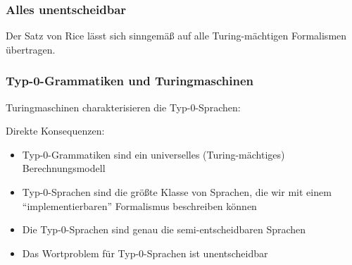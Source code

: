 \documentclass[onlymath]{beamer}
\begin{document}
\begin{frame}\frametitle{Alles unentscheidbar}


Der Satz von Rice lässt sich sinngemäß auf alle Turing-mächtigen Formalismen übertragen.

\end{frame}


\begin{frame}\frametitle{Typ-0-Grammatiken und Turingmaschinen}

Turingmaschinen charakterisieren die Typ-0-Sprachen:\medskip

\medskip\pause

\alert{Direkte Konsequenzen:}
\begin{itemize}
\item Typ-0-Grammatiken sind ein universelles (Turing-mächtiges) Berechnungsmodell
\item Typ-0-Sprachen sind die größte Klasse von Sprachen, die wir mit einem "`implementierbaren"' Formalismus beschreiben können
\item Die Typ-0-Sprachen sind genau die semi-entscheidbaren Sprachen
\item Das Wortproblem für Typ-0-Sprachen ist unentscheidbar
\end{itemize}

\end{frame}
\end{document}
